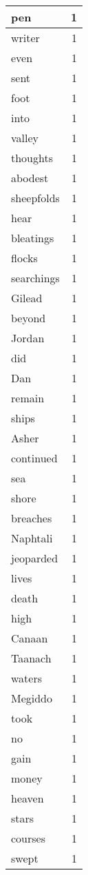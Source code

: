 \begin{center}
\begin{longtable}{l|r}
pen & 1\\ \hline 
writer & 1\\ \hline 
even & 1\\ \hline 
sent & 1\\ \hline 
foot & 1\\ \hline 
into & 1\\ \hline 
valley & 1\\ \hline 
thoughts & 1\\ \hline 
abodest & 1\\ \hline 
sheepfolds & 1\\ \hline 
hear & 1\\ \hline 
bleatings & 1\\ \hline 
flocks & 1\\ \hline 
searchings & 1\\ \hline 
Gilead & 1\\ \hline 
beyond & 1\\ \hline 
Jordan & 1\\ \hline 
did & 1\\ \hline 
Dan & 1\\ \hline 
remain & 1\\ \hline 
ships & 1\\ \hline 
Asher & 1\\ \hline 
continued & 1\\ \hline 
sea & 1\\ \hline 
shore & 1\\ \hline 
breaches & 1\\ \hline 
Naphtali & 1\\ \hline 
jeoparded & 1\\ \hline 
lives & 1\\ \hline 
death & 1\\ \hline 
high & 1\\ \hline 
Canaan & 1\\ \hline 
Taanach & 1\\ \hline 
waters & 1\\ \hline 
Megiddo & 1\\ \hline 
took & 1\\ \hline 
no & 1\\ \hline 
gain & 1\\ \hline 
money & 1\\ \hline 
heaven & 1\\ \hline 
stars & 1\\ \hline 
courses & 1\\ \hline 
swept & 1\\ \hline 

\end{longtable}
\end{center}
